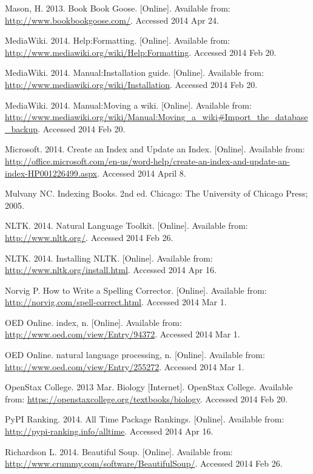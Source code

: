 \begin{thebibliography}{99}
Mason, H. 2013. Book Book Goose. [Online]. Available from: \url{http://www.bookbookgoose.com/}. Accessed 2014 Apr 24.

MediaWiki. 2014. Help:Formatting. [Online]. Available from: \url{http://www.mediawiki.org/wiki/Help:Formatting}. Accessed 2014 Feb 20.

MediaWiki. 2014. Manual:Installation guide. [Online]. Available from: \url{http://www.mediawiki.org/wiki/Installation}. Accessed 2014 Feb 20.

MediaWiki. 2014. Manual:Moving a wiki. [Online]. Available from: \url{http://www.mediawiki.org/wiki/Manual:Moving_a_wiki#Import_the_database_backup}. Accessed 2014 Feb 20.

Microsoft. 2014. Create an Index and Update an Index. [Online]. Available from: \url{http://office.microsoft.com/en-us/word-help/create-an-index-and-update-an-index-HP001226499.aspx}. Accessed 2014 April 8.

Mulvany NC. Indexing Books. 2nd ed. Chicago: The University of Chicago Press; 2005.

NLTK. 2014. Natural Language Toolkit. [Online]. Available from: \url{http://www.nltk.org/}. Accessed 2014 Feb 26.

NLTK. 2014. Installing NLTK. [Online]. Available from: \url{http://www.nltk.org/install.html}. Accessed 2014 Apr 16.

Norvig P. How to Write a Spelling Corrector. [Online]. Available from: \url{http://norvig.com/spell-correct.html}. Accessed 2014 Mar 1.

OED Online. index, n. [Online]. Available from: \url{http://www.oed.com/view/Entry/94372}. Accessed 2014 Mar 1.

OED Online. natural language processing, n. [Online]. Available from: \url{http://www.oed.com/view/Entry/255272}. Accessed 2014 Mar 1.

OpenStax College. 2013 Mar. Biology [Internet]. OpenStax College. Available from: \url{https://openstaxcollege.org/textbooks/biology}. Accessed 2014 Feb 20.

PyPI Ranking. 2014. All Time Package Rankings. [Online]. Available from: \url{http://pypi-ranking.info/alltime}. Accessed 2014 Apr 16.

Richardson L. 2014. Beautiful Soup. [Online]. Available from: \url{http://www.crummy.com/software/BeautifulSoup/}. Accessed 2014 Feb 26.


\end{thebibliography}

